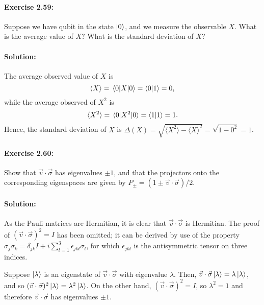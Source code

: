\paragraph{\cite{mikeandike} Exercise 2.59:} Suppose we have qubit in the state
$\ket{0}$, and we measure the observable $X$. What is the average value of $X$?
What is the standard deviation of $X$?

\paragraph{Solution:} The average observed value of $X$ is \begin{equation*}
  \langle X \rangle = \mel{0}{X}{0} = \braket{0}{1} = 0,
\end{equation*} while the average observed of $X^2$ is \begin{equation*}
  \langle X^2 \rangle = \mel{0}{X^2}{0} = \braket{1}{1} = 1.
\end{equation*} Hence, the standard deviation of $X$ is $\Delta(X) = \sqrt{
\langle X^2 \rangle - \langle X \rangle^2} = \sqrt{1 - 0^2} = 1$.

\paragraph{\cite{mikeandike} Exercise 2.60:} Show that $\vec{v} \cdot
\vec{\sigma}$ has eigenvalues $\pm 1$, and that the projectors onto the
corresponding eigenspaces are given by $P_\pm = (1 \pm \vec{v} \cdot
\vec{\sigma})/2$.

\paragraph{Solution:} As the Pauli matrices are Hermitian, it is clear that
$\vec{v} \cdot \vec{\sigma}$ is Hermitian. The proof of $(\vec{v} \cdot
\vec{\sigma})^2 = I$ has been omitted; it can be derived by use of the property
$\sigma_j\sigma_k = \delta_{jk}I + i\sum_{l = 1}^3\epsilon_{jkl}\sigma_l$, for
which $\epsilon_{jkl}$ is the antisymmetric tensor on three indices.

Suppose $\ket{\lambda}$ is an eigenstate of $\vec{v} \cdot \vec{\sigma}$ with
eigenvalue $\lambda$. Then, $\vec{v} \cdot \vec{\sigma} \ket{\lambda} = \lambda
\ket{\lambda}$, and so $(\vec{v} \cdot \vec{\sigma})^2 \ket{\lambda} =
\lambda^2 \ket{\lambda}$. On the other hand, $(\vec{v} \cdot \vec{\sigma})^2 =
I$, so $\lambda^2 = 1$ and therefore $\vec{v} \cdot \vec{\sigma}$ has
eigenvalues $\pm 1$.

